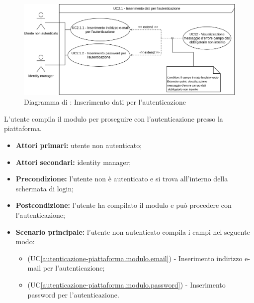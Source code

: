 \begin{figure}[H]
	\centering
	\includegraphics[scale=0.8]{Immagini/DiagrammiUC/AccessoAllaPiattaforma/InserimentoDatiAutenticazione.png}
	\caption{Diagramma di \actualSubUC: Inserimento dati per l'autenticazione}
	\label{fig:autenticazione-piattaforma.modulo}
\end{figure}

L'utente compila il modulo per proseguire con l'autenticazione presso la piattaforma.
\begin{itemize}
	\item \textbf{Attori primari:} utente non autenticato;
	\item \textbf{Attori secondari:} identity manager;
	\item \textbf{Precondizione:} l'utente non è autenticato e si trova all'interno della schermata di login;
	\item \textbf{Postcondizione:} l'utente ha compilato il modulo e può procedere con l'autenticazione;
	\item \textbf{Scenario principale:} l'utente non autenticato compila i campi nel seguente modo:
	\begin{itemize}
		\item (UC\ref{autenticazione-piattaforma.modulo.email}) - Inserimento indirizzo e-mail per l'autenticazione;
		\item (UC\ref{autenticazione-piattaforma.modulo.password}) - Inserimento password per l'autenticazione.
	\end{itemize}
\end{itemize}

\label{autenticazione-piattaforma.modulo.email}

